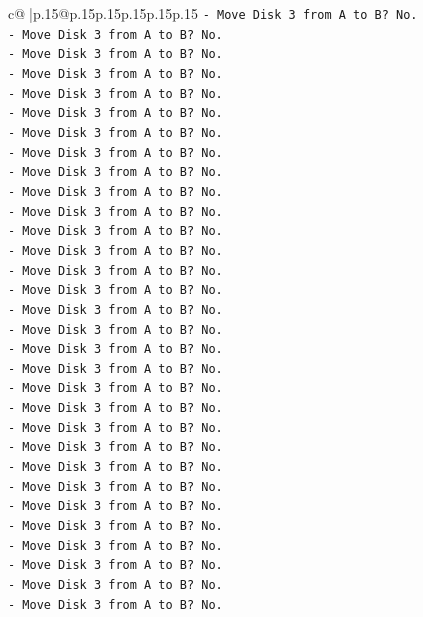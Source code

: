 \documentclass{article}
\begin{document}
{\begin{supertabular}{c@{$\;$}|p{.15\linewidth}@{}p{.15\linewidth}p{.15\linewidth}p{.15\linewidth}p{.15\linewidth}p{.15\linewidth}}
{{{\texttt{{-} Move Disk 3 from A to B? No.} \\
\texttt{{-} Move Disk 3 from A to B? No.} \\
\texttt{{-} Move Disk 3 from A to B? No.} \\
\texttt{{-} Move Disk 3 from A to B? No.} \\
\texttt{{-} Move Disk 3 from A to B? No.} \\
\texttt{{-} Move Disk 3 from A to B? No.} \\
\texttt{{-} Move Disk 3 from A to B? No.} \\
\texttt{{-} Move Disk 3 from A to B? No.} \\
\texttt{{-} Move Disk 3 from A to B? No.} \\
\texttt{{-} Move Disk 3 from A to B? No.} \\
\texttt{{-} Move Disk 3 from A to B? No.} \\
\texttt{{-} Move Disk 3 from A to B? No.} \\
\texttt{{-} Move Disk 3 from A to B? No.} \\
\texttt{{-} Move Disk 3 from A to B? No.} \\
\texttt{{-} Move Disk 3 from A to B? No.} \\
\texttt{{-} Move Disk 3 from A to B? No.} \\
\texttt{{-} Move Disk 3 from A to B? No.} \\
\texttt{{-} Move Disk 3 from A to B? No.} \\
\texttt{{-} Move Disk 3 from A to B? No.} \\
\texttt{{-} Move Disk 3 from A to B? No.} \\
\texttt{{-} Move Disk 3 from A to B? No.} \\
\texttt{{-} Move Disk 3 from A to B? No.} \\
\texttt{{-} Move Disk 3 from A to B? No.} \\
\texttt{{-} Move Disk 3 from A to B? No.} \\
\texttt{{-} Move Disk 3 from A to B? No.} \\
\texttt{{-} Move Disk 3 from A to B? No.} \\
\texttt{{-} Move Disk 3 from A to B? No.} \\
\texttt{{-} Move Disk 3 from A to B? No.} \\
\texttt{{-} Move Disk 3 from A to B? No.} \\
\texttt{{-} Move Disk 3 from A to B? No.} \\
\texttt{{-} Move Disk 3 from A to B? No.} \\
}}}
\end{supertabular}}
\end{document}
